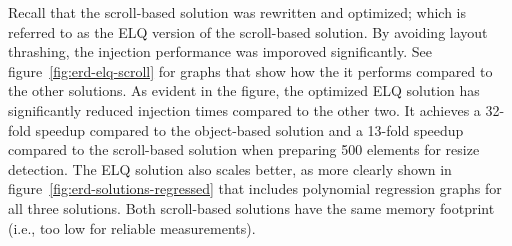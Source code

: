 \documentclass[a4paper,11pt]{kth-mag}
\begin{document}
        Recall that the scroll-based solution was rewritten and optimized; which is referred to as the \gls{ELQ} version of the scroll-based solution.
        By avoiding \gls{layout thrashing}, the injection performance was imporoved significantly.
        See figure~\ref{fig:erd-elq-scroll} for graphs that show how the it performs compared to the other solutions.
        As evident in the figure, the optimized \gls{ELQ} solution has significantly reduced injection times compared to the other two.
        It achieves a 32-fold speedup compared to the object-based solution and a 13-fold speedup compared to the scroll-based solution when preparing 500 \glspl{element} for resize detection.
        The \gls{ELQ} solution also scales better, as more clearly shown in figure~\ref{fig:erd-solutions-regressed} that includes polynomial regression graphs for all three solutions.
        Both scroll-based solutions have the same memory footprint (i.e., too low for reliable measurements).
\end{document}
